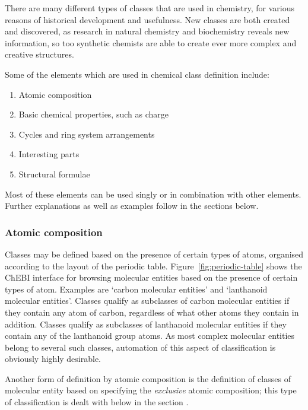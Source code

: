 \documentclass[10pt]{bmc_article}
\newenvironment{bmcformat}{\baselineskip20pt\sloppy\setboolean{publ}{false}}{\baselineskip20pt\sloppy}
\begin{document}
\begin{bmcformat}
There are many different types of classes that are used in chemistry, for various reasons of historical development and usefulness. New classes are both created and discovered, as research in natural chemistry and biochemistry reveals new information, so too synthetic chemists are able to create ever more complex and creative structures.

Some of the elements which are used in chemical class definition include: 
\begin{enumerate}
	\item Atomic composition
	\item Basic chemical properties, such as charge
	\item Cycles and ring system arrangements
	\item Interesting parts
	\item Structural formulae
\end{enumerate}

Most of these elements can be used singly or in combination with other elements.  Further explanations as well as examples follow in the sections below. 

\subsubsection*{Atomic composition}

Classes may be defined based on the presence of certain types of atoms, organised according to the layout of the periodic table.  Figure~\ref{fig:periodic-table} shows the ChEBI interface for browsing molecular entities based on the presence of certain types of atom.  Examples are `carbon molecular entities' and `lanthanoid molecular entities'. Classes qualify as subclasses of carbon molecular entities if they contain any atom of carbon, regardless of what other atoms they contain in addition.  Classes qualify as subclasses of lanthanoid molecular entities if they contain any of the lanthanoid group atoms.  As most complex molecular entities belong to several such classes, automation of this aspect of classification is obviously highly desirable. 


Another form of definition by atomic composition is the definition of classes of molecular entity based on specifying the \textit{exclusive} atomic composition; this type of classification is dealt with below in the section \textit{}.



\end{bmcformat}
\end{document}
